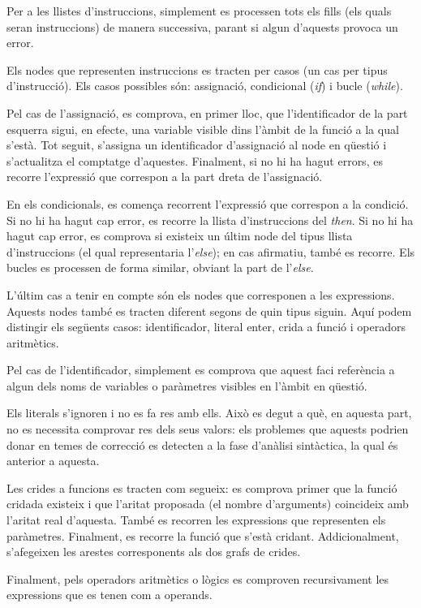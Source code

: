 Per a les llistes d'instruccions, simplement es processen tots els fills (els 
quals seran instruccions) de manera successiva, parant si algun d'aquests 
provoca un error.

Els nodes que representen instruccions es tracten per casos (un cas per tipus 
d'instrucció). Els casos possibles són: assignació, condicional (\textit{if}) i 
bucle (\textit{while}).

Pel cas de l'assignació, es comprova, en primer lloc, que l'identificador de 
la part esquerra sigui, en efecte, una variable visible dins l'àmbit de la 
funció a la qual s'està. Tot seguit, s'assigna un identificador d'assignació 
al node en qüestió i s'actualitza el comptatge d'aquestes. Finalment, si no hi 
ha hagut errors, es recorre l'expressió que correspon a la part dreta de 
l'assignació.

En els condicionals, es comença recorrent l'expressió que correspon a la 
condició. Si no hi ha hagut cap error, es recorre la llista d'instruccions del 
\textit{then}. Si no hi ha hagut cap error, es comprova si existeix un últim 
node del tipus llista d'instruccions (el qual representaria l'\textit{else}); 
en cas afirmatiu, també es recorre. Els bucles es processen de forma similar, 
obviant la part de l'\textit{else}.

L'últim cas a tenir en compte són els nodes que corresponen a les expressions. 
Aquests nodes també es tracten diferent segons de quin tipus siguin. Aquí 
podem distingir els següents casos: identificador, literal enter, crida a 
funció i operadors aritmètics.

Pel cas de l'identificador, simplement es comprova que aquest faci referència 
a algun dels noms de variables o paràmetres visibles en l'àmbit en qüestió.

Els literals s'ignoren i no es fa res amb ells. Això es degut a què, en 
aquesta part, no es necessita comprovar res dels seus valors: els problemes 
que aquests podrien donar en temes de correcció es detecten a la fase 
d'anàlisi sintàctica, la qual és anterior a aquesta.

Les crides a funcions es tracten com segueix: es comprova primer que la funció 
cridada existeix i que l'aritat proposada (el nombre d'arguments) coincideix 
amb l'aritat real d'aquesta. També es recorren les expressions que representen 
els paràmetres. Finalment, es recorre la funció que s'està cridant. 
Addicionalment, s'afegeixen les arestes corresponents als dos grafs de crides.

Finalment, pels operadors aritmètics o lògics es comproven recursivament les 
expressions que es tenen com a operands.



